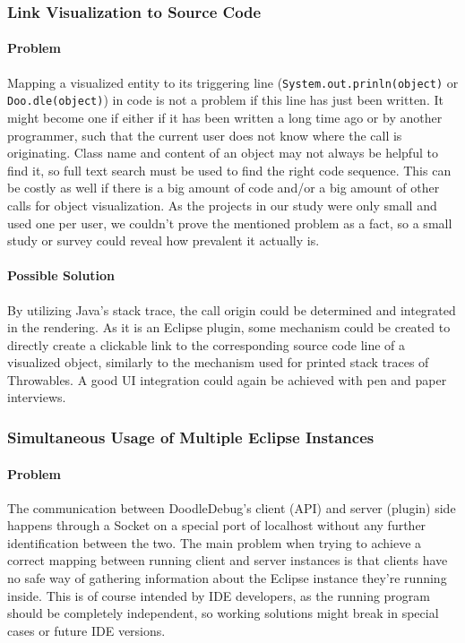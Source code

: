 \documentclass[english]{acm_proc_article-sp}
\begin{document}
\subsubsection{Link Visualization to Source Code}
\paragraph{Problem}
Mapping a visualized entity to its triggering line (\verb-System.out.prinln(object)- or \verb-Doo.dle(object)-) in code is not a problem if this line has just been written. It might become one if either if it has been written a long time ago or by another programmer, such that the current user does not know where the call is originating. Class name and content of an object may not always be helpful to find it, so full text search must be used to find the right code sequence. This can be costly as well if there is a big amount of code and/or a big amount of other calls for object visualization. As the projects in our study were only small and used one per user, we couldn't prove the mentioned problem as a fact, so a small study or survey could reveal how prevalent it actually is.

\paragraph{Possible Solution}
By utilizing Java's stack trace, the call origin could be determined and integrated in the rendering. As it is an Eclipse plugin, some mechanism could be created to directly create a clickable link to the corresponding source code line of a visualized object, similarly to the mechanism used for printed stack traces of Throwables. A good UI integration could again be achieved with pen and paper interviews.

\subsubsection{Simultaneous Usage of Multiple Eclipse Instances}
\paragraph{Problem}
The communication between DoodleDebug's client (API) and server (plugin) side happens through a Socket on a special port of localhost without any further identification between the two. The main problem when trying to achieve a correct mapping between running client and server instances is that clients have no safe way of gathering information about the Eclipse instance they're running inside. This is of course intended by IDE developers, as the running program should be completely independent, so working solutions might break in special cases or future IDE versions.
\end{document}
